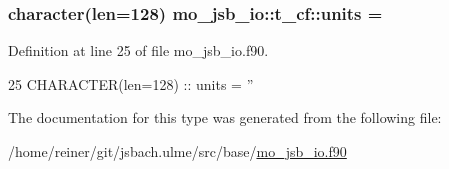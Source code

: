 \subsubsection[{units}]{\setlength{\rightskip}{0pt plus 5cm}character(len=128) mo\+\_\+jsb\+\_\+io\+::t\+\_\+cf\+::units = \textquotesingle{}\textquotesingle{}}\label{structmo__jsb__io_1_1t__cf_a1cfa1074fe607dc5208584dbbc88bf0f}


Definition at line 25 of file mo\+\_\+jsb\+\_\+io.\+f90.


\begin{DoxyCode}
25     \textcolor{keywordtype}{CHARACTER(len=128)} :: units         = \textcolor{stringliteral}{''}
\end{DoxyCode}


The documentation for this type was generated from the following file\+:\begin{DoxyCompactItemize}
\item 
/home/reiner/git/jsbach.\+ulme/src/base/\hyperlink{mo__jsb__io_8f90}{mo\+\_\+jsb\+\_\+io.\+f90}\end{DoxyCompactItemize}
